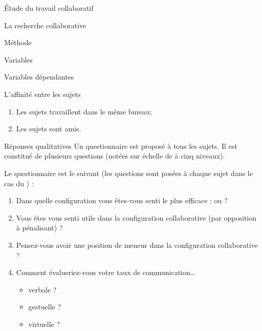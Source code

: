 \documentclass[myfrancais]{mythesis}
\begin{document}
\begin{mypart}{Étude du travail collaboratif}
\begin{mychapter}{La recherche collaborative}
\begin{mysection}{Méthode}
\begin{mysubsection}{Variables}
\begin{mysubsubsection}{Variables dépendantes}
\begin{myparagraph}{ L'affinité entre les sujets}
\begin{enumerate}
								\item Les sujets travaillent dans le même bureau;
								\item Les sujets sont amis.
							\end{enumerate}
						\end{myparagraph}
						\begin{myparagraph}{ Réponses qualitatives}
							Un questionnaire est proposé à tous les sujets.
							Il est constitué de plusieurs questions (notées sur échelle de  à cinq niveaux).

							Le questionnaire est le suivant (les questions sont posées à chaque sujet dans le cas du ) :
							\begin{enumerate}
								\item Dans quelle configuration vous êtes-vous senti le plus efficace :  ou  ?
								\item Vous êtes vous senti utile dans la configuration collaborative (par opposition à pénalisant) ?
								\item Pensez-vous avoir une position de meneur dans la configuration collaborative ?
								\item Comment évalueriez-vous votre taux de communication\dots{}
									\begin{itemize}
										\item verbale ?
										\item gestuelle ?
										\item virtuelle ?
									\end{itemize}
							\end{enumerate}


\end{myparagraph}
\end{mysubsubsection}
\end{mysubsection}
\end{mysection}
\end{mychapter}
\end{mypart}
\end{document}
